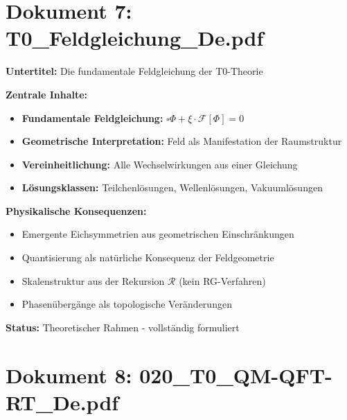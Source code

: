 	\section{Dokument 7: T0\_Feldgleichung\_De.pdf}
	
	\begin{documentbox}
		\textbf{Untertitel:} Die fundamentale Feldgleichung der T0-Theorie
		
		\textbf{Zentrale Inhalte:}
		\begin{itemize}
			\item \textbf{Fundamentale Feldgleichung:} $\square \Phi + \xi \cdot \mathcal{F}[\Phi] = 0$
			\item \textbf{Geometrische Interpretation:} Feld als Manifestation der Raumstruktur
			\item \textbf{Vereinheitlichung:} Alle Wechselwirkungen aus einer Gleichung
			\item \textbf{Lösungsklassen:} Teilchenlösungen, Wellenlösungen, Vakuumlösungen
		\end{itemize}
		
		\textbf{Physikalische Konsequenzen:}
		\begin{itemize}
			\item Emergente Eichsymmetrien aus geometrischen Einschränkungen
			\item Quantisierung als natürliche Konsequenz der Feldgeometrie
			\item Skalenstruktur aus der Rekursion $\mathcal{R}$ (kein RG-Verfahren)
			\item Phasenübergänge als topologische Veränderungen
		\end{itemize}
		
		\textbf{Status:} Theoretischer Rahmen - vollständig formuliert
	\end{documentbox}
	
	\section{Dokument 8: 020\_T0\_QM-QFT-RT\_De.pdf}
	
